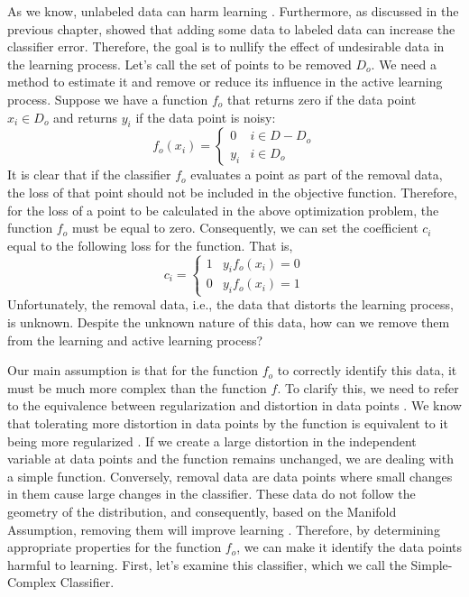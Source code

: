 	As we know, unlabeled data can harm learning \cite{zhang2000training}. Furthermore, as discussed in the previous chapter, \cite{cohen2004red} showed that adding some data to labeled data can increase the classifier error. Therefore, the goal is to nullify the effect of undesirable data in the learning process. Let's call the set of points to be removed $D_o$. We need a method to estimate it and remove or reduce its influence in the active learning process. Suppose we have a function $f_o$ that returns zero if the data point $x_i \in D_o$ and returns $y_i$ if the data point is noisy:
	\begin{equation}
		f_o(x_i) = 
		\begin{cases}
			0 & i \in D - D_o \\
			y_i & i \in D_o
		\end{cases}
	\end{equation}
	It is clear that if the classifier $f_o$ evaluates a point as part of the removal data, the loss of that point should not be included in the objective function. Therefore, for the loss of a point to be calculated in the above optimization problem, the function $f_o$ must be equal to zero. Consequently, we can set the coefficient $c_i$ equal to the following loss for the function. That is,
	\begin{equation}
		c_i = 
		\begin{cases}
			1 & y_i f_o(x_i) = 0 \\
			0 & y_i f_o(x_i) = 1
		\end{cases}
	\end{equation}
	Unfortunately, the removal data, i.e., the data that distorts the learning process, is unknown. Despite the unknown nature of this data, how can we remove them from the learning and active learning process?
	
	Our main assumption is that for the function $f_o$ to correctly identify this data, it must be much more complex than the function $f$. To clarify this, we need to refer to the equivalence between regularization and distortion in data points \cite{xu2007regularization}. We know that tolerating more distortion in data points by the function is equivalent to it being more regularized \cite{xu2007regularization}. If we create a large distortion in the independent variable at data points and the function remains unchanged, we are dealing with a simple function. Conversely, removal data are data points where small changes in them cause large changes in the classifier. These data do not follow the geometry of the distribution, and consequently, based on the Manifold Assumption, removing them will improve learning \cite{belkin2006manifold}. Therefore, by determining appropriate properties for the function $f_o$, we can make it identify the data points harmful to learning. First, let's examine this classifier, which we call the Simple-Complex Classifier.
	
